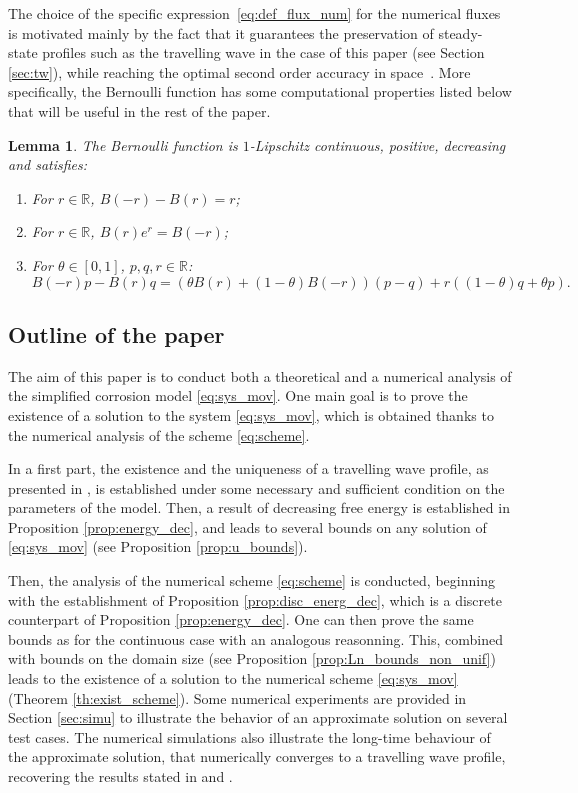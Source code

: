 \documentclass{amsart}
\newcommand\R{\mathbb{R}}
\newtheorem{lemma}[theorem]{Lemma}
\begin{document}
	The choice of the specific expression~\eqref{eq:def_flux_num} for the numerical fluxes is motivated mainly by the fact that it guarantees the preservation of steady-state profiles such as the travelling wave in the case of this paper (see Section \ref{sec:tw}), while reaching the optimal second order accuracy in space~\cite{LMV96}.  More specifically, the Bernoulli function has some computational properties listed below that will be useful in the rest of the paper. 
	\begin{lemma} \label{lem:Bern}
		The Bernoulli function is $1$-Lipschitz continuous, positive, decreasing and satisfies:
		\begin{enumerate}[label=(\textit{\roman*})]
			\item For $r \in \R$, $B(-r) - B(r) = r$;
			\item For $r \in \R$, $B(r)e^r = B(-r)$;
			\item For $\theta \in [0,1]$, $p,q,r \in \R$:
				\begin{equation} \label{eq:Bern}
					B(-r)p - B(r)q = (\theta B(r) + (1-\theta) B(-r))(p-q) + r((1-\theta)q + \theta p).
				\end{equation}
		\end{enumerate}
	\end{lemma}

\subsection{Outline of the paper}

The aim of this paper is to conduct both a theoretical and a numerical analysis of the simplified corrosion model \eqref{eq:sys_mov}. One main goal is to prove the existence of a solution to the system \eqref{eq:sys_mov}, which is obtained thanks to the numerical analysis of the scheme \eqref{eq:scheme}. 
	
In a first part, the existence and the uniqueness of a travelling wave profile, as presented in \cite{ChainGall}, is established under some necessary and sufficient condition on the parameters of the model. Then, a result of decreasing free energy is established in Proposition \ref{prop:energy_dec}, and leads to several bounds on any solution of \eqref{eq:sys_mov} (see Proposition \ref{prop:u_bounds}).
	
Then, the analysis of the numerical scheme \eqref{eq:scheme} is conducted, beginning with the establishment of Proposition \ref{prop:disc_energ_dec}, which is a discrete counterpart of Proposition \ref{prop:energy_dec}. One can then prove the same bounds as for the continuous case with an analogous reasonning. This, combined with bounds on the domain size (see Proposition \ref{prop:Ln_bounds_non_unif}) leads to the existence of a solution to the numerical scheme \eqref{eq:sys_mov} (Theorem \ref{th:exist_scheme}). Some numerical experiments are provided in Section \ref{sec:simu} to illustrate the behavior of an approximate solution on several test cases. The numerical simulations also illustrate the long-time behaviour of the approximate solution, that numerically converges to a travelling wave profile, recovering the results stated in \cite{Bataillon_elec} and \cite{Calipso}.
	
\end{document}
